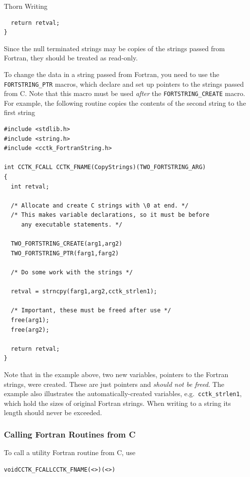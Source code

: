 \begin{cactuspart}{Thorn Writing}
\begin{verbatim}
  return retval;
}

\end{verbatim}

Since the null terminated strings may be copies of the strings passed
from Fortran, they should be treated as read-only.

To change the data in a string passed from Fortran, you need to use
the \texttt{FORTSTRING\_PTR} macros, which declare and set up pointers
to the strings passed from C. Note that this macro must be used
\emph{after} the \texttt{FORTSTRING\_CREATE} macro. For example, the
following routine copies the contents of the second string to the
first string

\begin{verbatim}
#include <stdlib.h>
#include <string.h>
#include <cctk_FortranString.h>

int CCTK_FCALL CCTK_FNAME(CopyStrings)(TWO_FORTSTRING_ARG)
{
  int retval;

  /* Allocate and create C strings with \0 at end. */
  /* This makes variable declarations, so it must be before
     any executable statements. */

  TWO_FORTSTRING_CREATE(arg1,arg2)
  TWO_FORTSTRING_PTR(farg1,farg2)

  /* Do some work with the strings */

  retval = strncpy(farg1,arg2,cctk_strlen1);

  /* Important, these must be freed after use */
  free(arg1);
  free(arg2);

  return retval;
}

\end{verbatim}

Note that in the example above, two new variables, pointers to the
Fortran strings, were created.  These are just pointers and
\emph{should not be freed}.  The example also illustrates the
automatically-created variables, e.g.\ \texttt{cctk\_strlen1},
which hold the sizes of original Fortran strings.
When writing to a string its length should never be exceeded.

\subsubsection{Calling Fortran Routines from C}
\label{sec:caforofr}

To call a utility Fortran routine from C, use
\begin{alltt}
void CCTK_FCALL CCTK_FNAME(<>)(<>)
\end{alltt}


\end{cactuspart}
